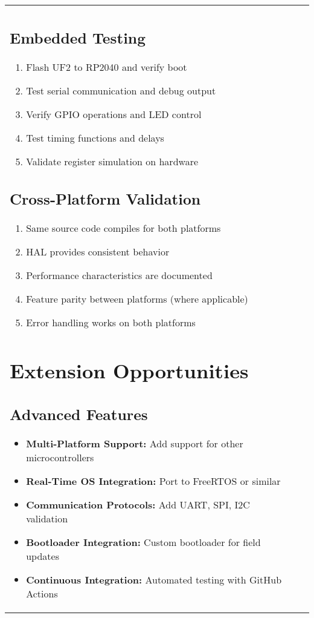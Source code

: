 \documentclass[11pt,a4paper]{article}
\begin{document}
\begin{center}
\begin{tabular}{|l|c|l|}
\subsection{Embedded Testing}
\begin{enumerate}
    \item Flash UF2 to RP2040 and verify boot
    \item Test serial communication and debug output
    \item Verify GPIO operations and LED control
    \item Test timing functions and delays
    \item Validate register simulation on hardware
\end{enumerate}

\subsection{Cross-Platform Validation}
\begin{enumerate}
    \item Same source code compiles for both platforms
    \item HAL provides consistent behavior
    \item Performance characteristics are documented
    \item Feature parity between platforms (where applicable)
    \item Error handling works on both platforms
\end{enumerate}

\section{Extension Opportunities}

\subsection{Advanced Features}
\begin{itemize}
    \item \textbf{Multi-Platform Support:} Add support for other microcontrollers
    \item \textbf{Real-Time OS Integration:} Port to FreeRTOS or similar
    \item \textbf{Communication Protocols:} Add UART, SPI, I2C validation
    \item \textbf{Bootloader Integration:} Custom bootloader for field updates
    \item \textbf{Continuous Integration:} Automated testing with GitHub Actions
\end{itemize}


\end{tabular}
\end{center}
\end{document}
